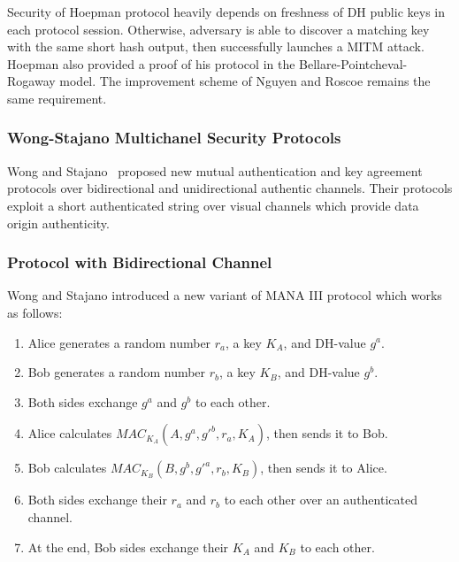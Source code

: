Security of Hoepman protocol heavily depends on freshness of DH public keys in each protocol session. Otherwise, adversary is able to discover a matching key with the same short hash output, then successfully launches a MITM attack. Hoepman also provided a proof of his protocol in the Bellare-Pointcheval- Rogaway model. The improvement scheme of Nguyen and Roscoe remains the same requirement. 

\subsubsection{Wong-Stajano Multichanel Security Protocols}\label{WS}

Wong and Stajano~\cite{10.1109/MPRV.2007.76} proposed new mutual authentication and key agreement protocols over bidirectional and unidirectional authentic channels. Their protocols exploit a short authenticated string over visual channels which provide data origin authenticity. 

\subsubsection*{Protocol with Bidirectional Channel}

Wong and Stajano introduced a new variant of MANA III protocol which works as follows:

\begin{enumerate}
\item Alice generates a random number $r_a$, a key $K_A$, and DH-value $g^a$.
\item Bob generates a random number $r_b$, a key $K_B$, and DH-value $g^b$.
\item Both sides exchange $g^a$ and $g^b$ to each other.
\item Alice calculates $MAC_{K_A}(A,g^a,g'^b,r_a,K_A)$, then sends it to Bob. 
\item Bob calculates $MAC_{K_B}(B,g^b,g'^a,r_b,K_B)$, then sends it to Alice.
\item Both sides exchange their $r_a$ and $r_b$ to each other over an authenticated channel. 
\item At the end, Bob sides exchange their $K_A$ and $K_B$ to each other. 
\end{enumerate}

